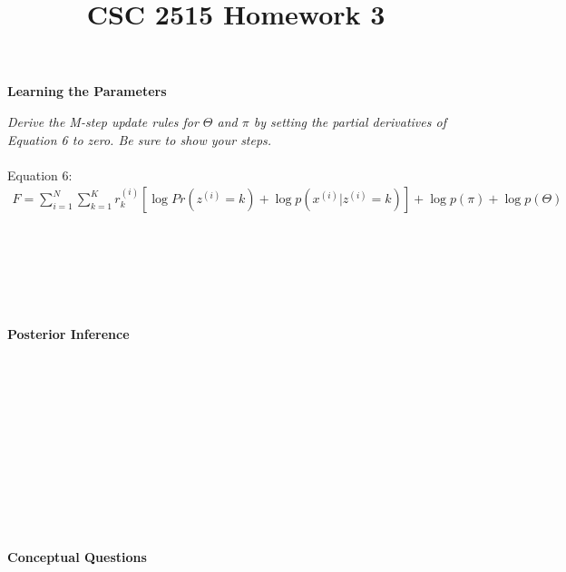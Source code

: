 \documentclass{myhw}
\title{CSC 2515 Homework 3}
\begin{document}
\begin{homeworkProblem}
\textbf{Learning the Parameters} 
\begin{homeworkSection}	
\emph{Derive the M-step update rules for $\Theta$ and $\pi$ by setting the partial derivatives of Equation 6 to zero. Be sure to show your steps.} \\
\\
Equation 6:
\begin{gather*}
F = \sum_{i=1}^{N}\sum_{k=1}^{K}r_k^{(i)}[\log{Pr(z^{(i)}=k)}+\log{p(x^{(i)}|z^{(i)}=k)}]+\log{p(\pi)}+\log{p(\Theta)}
\end{gather*}
\end{homeworkSection}
\begin{homeworkSection}	
\emph{} \\
\\
\end{homeworkSection}
\begin{homeworkSection}	
\emph{} \\
\\
\end{homeworkSection}
\end{homeworkProblem}


\begin{homeworkProblem}
\textbf{Posterior Inference}
\begin{homeworkSection}
\emph{} \\
\\
\end{homeworkSection}
\begin{homeworkSection}
\emph{} \\
\\
\end{homeworkSection}
\begin{homeworkSection}	
\emph{} \\
\\
\end{homeworkSection}
\begin{homeworkSection}	
\emph{} \\
\\
\end{homeworkSection}
\end{homeworkProblem}


\begin{homeworkProblem}
\textbf{Conceptual Questions}
\begin{homeworkSection}	
\emph{} \\
\\
\end{homeworkSection}
\begin{homeworkSection}	
\emph{} \\
\\
\end{homeworkSection}
\begin{homeworkSection}	
\emph{} \\
\\
\end{homeworkSection}
\end{homeworkProblem}
\end{document}
